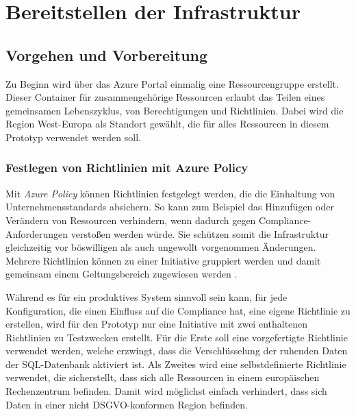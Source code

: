 \section{Bereitstellen der Infrastruktur} \label{sec:infra}

\subsection{Vorgehen und Vorbereitung} \label{subsec:infra:azDevOps}
Zu Beginn wird über das Azure Portal einmalig eine Ressourcengruppe erstellt. Dieser Container für zusammengehörige Ressourcen erlaubt das Teilen eines gemeinsamen Lebenszyklus, von Berechtigungen und Richtlinien. Dabei wird die Region West-Europa als Standort gewählt, die für alles Ressourcen in diesem Prototyp verwendet werden soll. 

\subsubsection{Festlegen von Richtlinien mit Azure Policy} \label{subsec:infra:prep:policy}
Mit \textit{Azure Policy} können Richtlinien festgelegt werden, die die Einhaltung von Unternehmensstandards absichern. So kann zum Beispiel das Hinzufügen oder Verändern von Ressourcen verhindern, wenn dadurch gegen Compliance-Anforderungen verstoßen werden würde. Sie schützen somit die Infrastruktur gleichzeitig vor böswilligen als auch ungewollt vorgenommen Änderungen. Mehrere Richtlinien können zu einer Initiative gruppiert werden und damit gemeinsam einem Geltungsbereich zugewiesen werden \cite{de_tender_azure_2019}.

Während es für ein produktives System sinnvoll sein kann, für jede Konfiguration, die einen Einfluss auf die Compliance hat, eine eigene Richtlinie zu erstellen, wird für den Prototyp nur eine Initiative mit zwei enthaltenen Richtlinien zu Testzwecken erstellt. Für die Erste soll eine vorgefertigte Richtlinie verwendet werden, welche erzwingt, dass die Verschlüsselung der ruhenden Daten der SQL-Datenbank aktiviert ist. Als Zweites wird eine selbstdefinierte Richtlinie verwendet, die sicherstellt, dass sich alle Ressourcen in einem europäischen Rechenzentrum befinden. Damit wird möglichst einfach verhindert, dass sich Daten in einer nicht DSGVO-konformen Region befinden.

